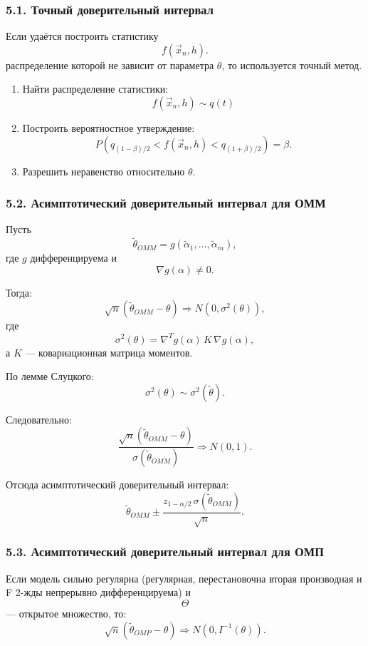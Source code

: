 \documentclass{article}
\begin{document}
\subsubsection*{5.1. Точный доверительный интервал}

Если удаётся построить статистику
\[
f(\vec{x}_n, h).
\]
распределение которой не зависит от параметра \(\theta\), то используется точный метод.

\begin{enumerate}
    \item Найти распределение статистики:
    \[
    f(\vec{x}_n, h) \sim q(t)
    \]

    \item Построить вероятностное утверждение:
    \[
    P\left(
    q_{(1-\beta)/2}<f(\vec{x}_n, h)<q_{(1+\beta)/2}
    \right)=\beta.
    \]

    \item Разрешить неравенство относительно \(\theta\).
\end{enumerate}

\subsubsection*{5.2. Асимптотический доверительный интервал для ОММ}

Пусть
\[
\widetilde{\theta}_{OMM}
=
g(\widetilde{\alpha}_1,\dots,\widetilde{\alpha}_m),
\]
где \(g\) дифференцируема и
\[
\nabla g(\alpha)\neq0.
\]

Тогда:
\[
\sqrt n
\left(
\widetilde{\theta}_{OMM}-\theta
\right)
\Rightarrow
N(0,\sigma^2(\theta)),
\]
где
\[
\sigma^2(\theta)
=
\nabla^T g(\alpha)\,
K\,
\nabla g(\alpha),
\]
а \(K\) --- ковариационная матрица моментов.

По лемме Слуцкого:
\[
\sigma^2(\theta)
\sim
\sigma^2(\widetilde{\theta}).
\]

Следовательно:
\[
\frac{
\sqrt n
(\widetilde{\theta}_{OMM}-\theta)
}{
\sigma(\widetilde{\theta}_{OMM})
}
\Rightarrow
N(0,1).
\]

Отсюда асимптотический доверительный интервал:
\[
\widetilde{\theta}_{OMM}
\pm
\frac{
z_{1-\alpha/2}\,
\sigma(\widetilde{\theta}_{OMM})
}{
\sqrt n
}.
\]

\subsubsection*{5.3. Асимптотический доверительный интервал для ОМП}

Если модель сильно регулярна (регулярная, перестановочна вторая производная и F 2-жды непрерывно дифференцируема) и
\[
\Theta
\]
--- открытое множество, то:
\[
\sqrt n
(\widetilde{\theta}_{OMP}-\theta)
\Rightarrow
N\left(
0,
I^{-1}(\theta)
\right).
\]
\end{document}
